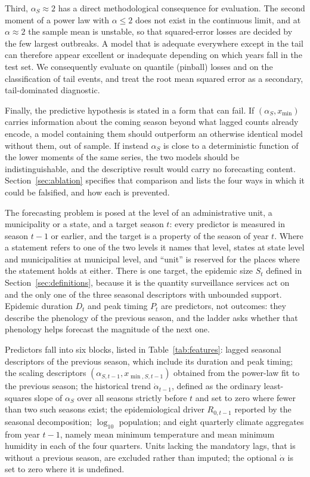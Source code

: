 \documentclass[english,10pt,b5paper]{article}
\begin{document}
Third, $\alpha_S\approx2$ has a direct methodological consequence for evaluation.
The second moment of a power law with $\alpha \le 2$ does not exist in the
continuous limit, and at $\alpha \approx 2$ the sample mean is unstable, so that
squared-error losses are decided by the few largest outbreaks. A model that is
adequate everywhere except in the tail can therefore appear excellent or
inadequate depending on which years fall in the test set. We consequently
evaluate on quantile (pinball) losses and on the classification of tail events,
and treat the root mean squared error as a secondary, tail-dominated diagnostic.

Finally, the predictive hypothesis is stated in a form that can fail. If
$(\alpha_S, x_{\min})$ carries information about the coming season beyond what
lagged counts already encode, a model containing them should outperform an
otherwise identical model without them, out of sample. If instead $\alpha_S$
is close to a deterministic function of the lower moments of the same series,
the two models should be indistinguishable, and the descriptive result would
carry no forecasting content. Section~\ref{sec:ablation} specifies that
comparison and lists the four ways in which it could be falsified, and how
each is prevented.

The forecasting problem is posed at the level of an administrative unit, a
municipality or a state, and a target season $t$: every predictor is measured in
season $t-1$ or earlier, and the target is a property of the season of year $t$.
Where a statement refers to one of the two levels it names that level, states at
state level and municipalities at municipal level, and ``unit'' is reserved for the
places where the statement holds at either.
There is one target, the epidemic size $S_t$ defined in
Section~\ref{sec:definitions}, because it is the quantity surveillance services
act on and the only one of the three seasonal descriptors with unbounded support.
Epidemic duration $D_t$ and peak timing $P_t$ are predictors, not outcomes: they
describe the phenology of the previous season, and the ladder asks whether that
phenology helps forecast the magnitude of the next one.

Predictors fall into six blocks, listed in Table~\ref{tab:features}: lagged
seasonal descriptors of the previous season, which include its duration and peak
timing; the scaling descriptors $(\alpha_{S,t-1}, x_{\min,S,t-1})$ obtained from
the power-law fit to the previous season; the historical trend
$\dot\alpha_{t-1}$, defined as the ordinary least-squares slope of $\alpha_S$ over
all seasons strictly before $t$ and set to zero where fewer than two such seasons
exist; the epidemiological driver $R_{0,t-1}$ reported by the seasonal
decomposition; $\log_{10}$ population; and eight quarterly climate aggregates
from year $t-1$, namely mean minimum temperature and mean minimum humidity in each
of the four quarters. Units lacking the mandatory lags, that is without a previous
season, are excluded rather than imputed; the optional $\dot\alpha$ is set to zero
where it is undefined.
\end{document}
